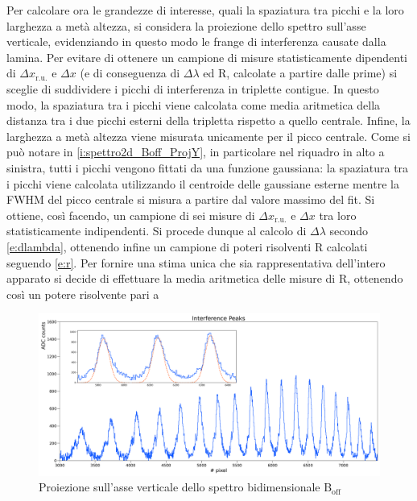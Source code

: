 \documentclass[twocolumn,10pt]{asme2ej}
\begin{document}
\noindent Per calcolare ora le grandezze di interesse, quali la spaziatura tra picchi e la loro larghezza a metà
altezza, si considera la proiezione dello spettro sull'asse verticale, evidenziando in questo modo le frange di
interferenza causate dalla lamina. Per evitare di ottenere un campione di misure statisticamente dipendenti di $\Delta
x_{\text{r.u.}}$ e $\Delta x$ (e di conseguenza di $\Delta\lambda$ ed R, calcolate a partire dalle prime) si sceglie di
suddividere i picchi di interferenza in triplette contigue. In questo modo, la spaziatura tra i picchi viene calcolata
come media aritmetica della distanza tra i due picchi esterni della tripletta rispetto a quello centrale. Infine, la
larghezza a metà altezza viene misurata unicamente per il picco centrale. Come si può notare in
\autoref{i:spettro2d_Boff_ProjY}, in particolare nel riquadro in alto a sinistra, tutti i picchi vengono fittati da una
funzione gaussiana: la spaziatura tra i picchi viene calcolata utilizzando il centroide delle gaussiane esterne mentre
la FWHM del picco centrale si misura a partire dal valore massimo del fit. Si ottiene, così facendo, un campione di sei
misure di $\Delta x_{\text{r.u.}}$ e $\Delta x$ tra loro statisticamente indipendenti. Si procede dunque al calcolo di
$\Delta\lambda$ secondo \autoref{e:dlambda}, ottenendo infine un campione di poteri risolventi R calcolati seguendo
\autoref{e:r}. Per fornire una stima unica che sia rappresentativa dell'intero apparato si decide di effettuare la media
aritmetica delle misure di R, ottenendo così un potere risolvente pari a 

\begin{figure}
    \centering
    \includegraphics[width=\textwidth]{../Plots/Boff_Y_proj.png}
   \caption{Proiezione sull'asse verticale dello spettro bidimensionale $\text{B}_{\text{off}}$}
    \label{i:spettro2d_Boff_ProjY}
\end{figure}
\end{document}
